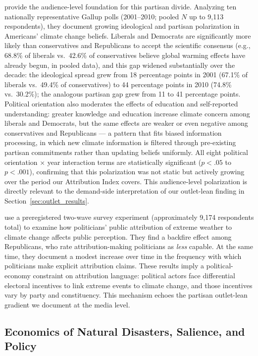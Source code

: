 \documentclass[12pt]{article}
\begin{document}
\citet{mccright2011} provide the audience-level foundation for this
partisan divide.  Analyzing ten nationally representative Gallup polls
(2001--2010; pooled $N$ up to 9{,}113 respondents), they document
growing ideological and partisan polarization in Americans' climate
change beliefs.  Liberals and Democrats are significantly more likely
than conservatives and Republicans to accept the scientific consensus
(e.g., 68.8\% of liberals vs.\ 42.6\% of conservatives believe global
warming effects have already begun, in pooled data), and this gap
widened substantially over the decade: the ideological spread grew from
18 percentage points in 2001 (67.1\% of liberals vs.\ 49.4\% of
conservatives) to 44 percentage points in 2010 (74.8\% vs.\ 30.2\%);
the analogous partisan gap grew from 11 to 41 percentage points.
Political orientation also moderates the effects of education and
self-reported understanding: greater knowledge and education increase
climate concern among liberals and Democrats, but the same effects are
weaker or even negative among conservatives and Republicans --- a
pattern that fits biased information processing, in which new
climate information is filtered through pre-existing partisan
commitments rather than updating beliefs uniformly.  All eight
political orientation $\times$ year interaction terms are statistically
significant ($p < .05$ to $p < .001$), confirming that this polarization
was not static but actively growing over the period our Attribution
Index covers.  This audience-level polarization is directly relevant to
the demand-side interpretation of our outlet-lean finding in
Section~\ref{sec:outlet_results}.

\citet{hai2022} use a preregistered two-wave survey experiment
(approximately 9,174 respondents total) to examine how politicians'
public attribution of extreme weather to climate change affects public
perception.  They find a backfire effect among Republicans, who rate
attribution-making politicians as \emph{less} capable.  At the same
time, they document a modest increase over time in the frequency with
which politicians make explicit attribution claims.  These results imply
a political-economy constraint on attribution language: political actors
face differential electoral incentives to link extreme events to climate
change, and those incentives vary by party and constituency.  This
mechanism echoes the partisan outlet-lean gradient we
document at the media level.

\subsection*{Economics of Natural Disasters, Salience, and Policy}
\end{document}
